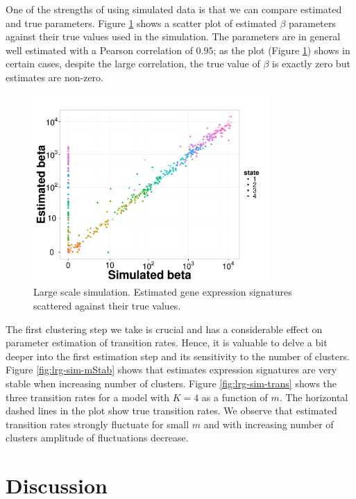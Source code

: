 One of the strengths of using simulated data is that we can compare estimated and true parameters. Figure \ref{fig:lrg-sim-scatter-b} shows a scatter plot of estimated $\beta$ parameters against their true values used in the simulation. The parameters are in general well estimated with a Pearson correlation of $0.95$; as the plot (Figure \ref{fig:lrg-sim-scatter-b}) shows in certain cases, despite the large correlation, the true value of $\beta$ is exactly zero but estimates are non-zero.

\begin{figure}[!h]
  \centering
  \includegraphics[width=0.8\textwidth]{pics/beta-sim.pdf}
  \caption{Large scale simulation. Estimated gene expression signatures scattered against their true values. }
  \label{fig:lrg-sim-scatter-b}
\end{figure}

The first clustering step we take is crucial and has a considerable effect on parameter estimation of transition rates. Hence, it is valuable to delve a bit deeper into the first estimation step and its sensitivity to the number of clusters. Figure \ref{fig:lrg-sim-mStab} shows that estimates expression signatures are very stable when increasing number of clusters. Figure \ref{fig:lrg-sim-trans} shows the three transition rates for a model with $K=4$ as a function of $m$. The horizontal dashed lines in the plot show true transition rates. We observe that estimated transition rates strongly fluctuate for small $m$ and with increasing number of clusters amplitude of fluctuations decrease.

\section{Discussion}
\label{sec:discussion}


